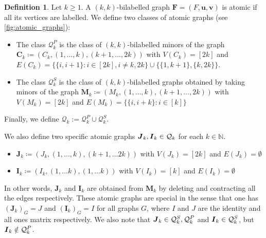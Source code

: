 \documentclass[a4paper,onecolumn,11pt,accepted=2026-01-06]{quantumarticle}
\theoremstyle{plain}
\theoremstyle{remark}
\theoremstyle{definition}
\newtheorem{definition}[thm]{Definition}
\begin{document}


\begin{definition}\label{def:atomic-q}
  Let $k\geq 1$.
  A $(k, k)$-bilabelled graph $\boldsymbol{F} = (F, \boldsymbol{u}, \boldsymbol{v})$  is atomic if all its vertices are labelled. %
  We define two classes of atomic graphs (see \cref{fig:atomic_graphs}):
  \begin{itemize}
    \item The class $\mathcal{Q}_k^P$ is the class of $(k, k)$-bilabelled minors of the graph
      $\boldsymbol{C}_k \coloneqq (C_k, (1,\dots, k), (k+1,\dots,2k))$ with $V(C_k) = [2k]$ and $E(C_k) = \{\{i,i+1\} : i\in[2k], i\neq k,2k\} \cup \{\{1, k+1\}, \{k, 2k\}\}.$
    \item The class $\mathcal{Q}_k^S$ is the class of $(k,k)$-bilabelled graphs obtained by taking minors of the graph
      $\boldsymbol{M}_k \coloneqq (M_k, (1,\dots, k), (k+1,\dots,2k))$ with $V(M_k) = [2k]$ and $E(M_k) = \{\{i, i+k\} : i\in[k]\}$
  \end{itemize}
  Finally, we define $\mathcal{Q}_k := \mathcal{Q}_k^P \cup \mathcal{Q}_k^S$.

  We also define two specific atomic graphs $\boldsymbol{J}_k, \boldsymbol{I}_k \in {\mathcal Q}_k$ for each $k \in \mathbb{N}$. 
  \begin{itemize}
      \item $\boldsymbol{J}_k \coloneq (J_k, (1, \dots, k), (k+1, \dots 2k))$ with $V(J_k) = [2k]$ and $E(J_k) = \emptyset$
      \item $\boldsymbol{I}_k \coloneq (I_k, (1, \dots k), (1, \dots k))$ with $V(I_k) = [k]$ and $E(I_k) = \emptyset$
  \end{itemize}
  In other words, $\boldsymbol{J}_k$ and $\boldsymbol{I}_k$ are obtained from $\boldsymbol{M}_k$ by deleting and contracting all the edges respectively. These atomic graphs are special in the sense that one has $(\boldsymbol{J}_k)_G = J$ and $(\boldsymbol{I}_k)_G = I$ for all graphs $G$, where $I$ and $J$ are the identity and all ones matrix respectively. We also note that $\boldsymbol{J}_k \in {\mathcal Q}_k^S, {\mathcal Q}_k^P$ and $\boldsymbol{I}_k \in {\mathcal Q}_k^S$, but $\boldsymbol{I}_k \notin {\mathcal Q}_k^P$.  
\end{definition}
\end{document}
